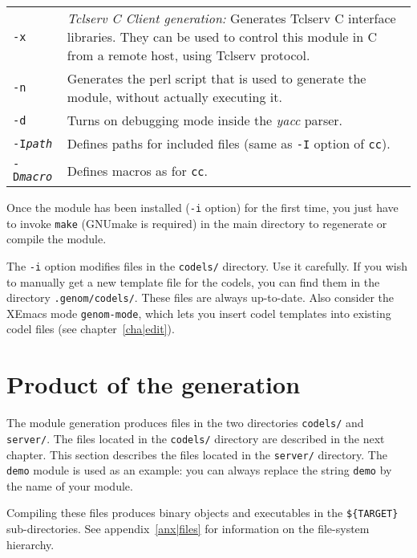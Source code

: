 \begin{description}
\begin{tabularx}{\linewidth}{lX}
\texttt{-x} & \emph{Tclserv C Client generation:} Generates Tclserv C interface
libraries. They can be used to control this module in C from a remote host, using
Tclserv protocol.\\

\texttt{-n} & Generates the perl script that is used to generate the module,
without actually executing it.\\

\texttt{-d} & Turns on debugging mode inside the \emph{yacc} parser.\\

\texttt{-I\emph{path}} & Defines paths for included files (same as 
\texttt{-I} option of \texttt{cc}).\\

\texttt{-D\emph{macro}} & Defines macros as for \texttt{cc}.\\
\end{tabularx}

Once the module has been installed (\texttt{-i} option)  for the first time,
you just   have to invoke \texttt{make}   (GNUmake is required)  in the main
directory to regenerate or compile the module.

The \texttt{-i} option modifies files in the \texttt{codels/} directory. Use it
carefully.  If you wish  to manually  get a  new   template file for  the
codels, you can find them in the directory \texttt{.genom/codels/}.  These files
are always  up-to-date. Also consider the  XEmacs  mode \texttt{genom-mode},
which lets  you  insert codel templates  into  existing codel files  (see
chapter~\ref{cha|edit}).

\end{description}


\section{Product of the generation}

The module generation produces files in the two directories \texttt{codels/}
and \texttt{server/}.  The files located  in the  \texttt{codels/}  directory are
described in the next chapter.  This  section describes the files located
in  the  \texttt{server/} directory.   The \texttt{demo} module   is  used as an
example: you can always replace the string \texttt{demo} by the name of your
module.

Compiling these files produces binary objects and executables in the 
\texttt{\$\{TARGET\}} sub-\-directories. See appendix~\ref{anx|files} for
information on the file-system hierarchy.

